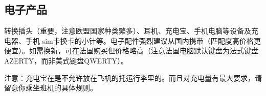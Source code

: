 \subsection{电子产品}

转换插头（重要，注意欧盟国家种类繁多）、耳机、充电宝、手机电脑等设备及充电器、手机 sim卡换卡的小针等。电子配件强烈建议从国内携带（匹配度高价格更便宜）。如需换新，可在法国购买但价格略高（注意法国电脑默认键盘为法式键盘AZERTY，而非美式键盘QWERTY）。

注意：充电宝在是不允许放在飞机的托运行李里的。而且对充电量有最大要求，请留意你乘坐班机的具体规则。
